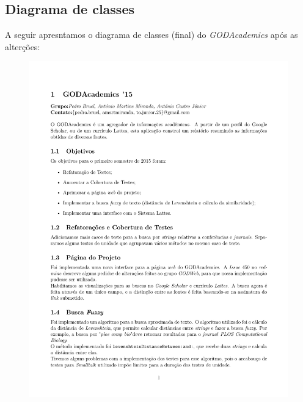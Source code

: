 \documentclass[12pt]{article}
\begin{document}
\subsection{Diagrama de classes}

A seguir apresntamos o diagrama de classes (final) do \emph{GODAcademics} após as alterções:

\begin{figure}[b]
\centering
\includegraphics[width=1.3\textwidth, height=1\textwidth, angle =-90 ]{GODAcad}
\end{figure}
\end{document}
